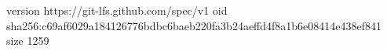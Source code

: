 version https://git-lfs.github.com/spec/v1
oid sha256:c69af6029a184126776bdbc6baeb220fa3b24aeffd4f8a1b6e08414e438ef841
size 1259
